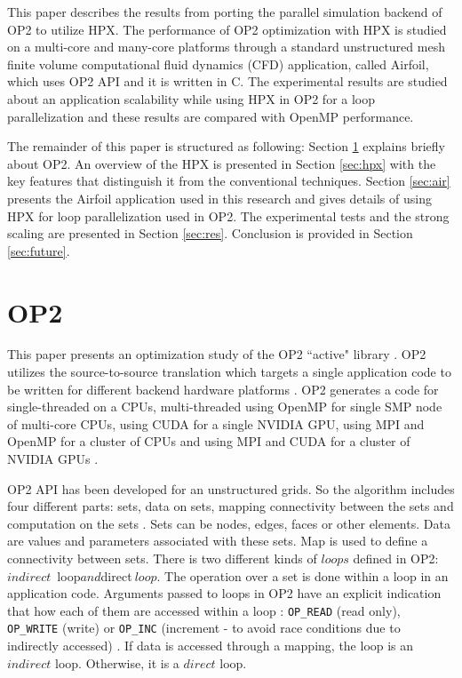 \documentclass[conference]{IEEEtran}
\begin{document}
This paper describes the results from porting the parallel simulation backend of OP2 to utilize HPX. The performance of OP2 optimization with HPX is studied on a multi-core and many-core platforms through a standard unstructured mesh finite volume computational fluid dynamics (CFD) application, called Airfoil, which uses OP2 API and it is written in C. The experimental results are studied about an application scalability while using HPX in OP2 for a loop parallelization and these results are compared with OpenMP performance.

The remainder of this paper is structured as following: Section \ref{sec:op2} explains briefly about OP2. An overview of the HPX is presented in Section \ref{sec:hpx} with the key features that distinguish it from the conventional techniques. Section \ref{sec:air} presents the Airfoil application used in this research and gives details of using HPX for loop parallelization used in OP2. The experimental tests and the strong scaling are presented in Section \ref{sec:res}. Conclusion is provided in Section \ref{sec:future}.

\section{OP2}
\label{sec:op2}

This paper presents an optimization study of the OP2 ``active" library \cite{o1}. OP2 utilizes the source-to-source translation which targets a single application code to be written for different backend hardware platforms \cite{o2,o3,o4}. OP2 generates a code for single-threaded on a CPUs, multi-threaded using OpenMP for single SMP node of multi-core CPUs, using CUDA for a single NVIDIA GPU, using MPI and OpenMP for a cluster of CPUs and using MPI and CUDA for a cluster of NVIDIA GPUs \cite{o4}. 

OP2 API has been developed for an unstructured grids. So the algorithm includes four different parts: sets, data on sets, mapping connectivity between the sets and computation on the sets \cite{o2,o7}. Sets can be nodes, edges, faces or other elements. Data are values and parameters associated with these sets. Map is used to define a connectivity between sets. There is two different kinds of $loops$ defined in OP2: $indirect$~loop$ and $direct$~loop$. The operation over a set is done within a loop in an application code. Arguments passed to loops in OP2 have an explicit indication that how each of them are accessed within a loop : \texttt{OP\_READ} (read only), \texttt{OP\_WRITE} (write) or \texttt{OP\_INC} (increment - to avoid race conditions due to indirectly accessed) \cite{o1}. If data is accessed through a mapping, the loop is an $indirect$ loop. Otherwise, it is a $direct$ loop. 
\end{document}
